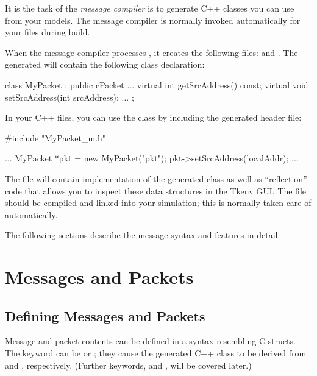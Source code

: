 It is the task of the \textit{message compiler} is to generate C++ classes
you can use from your models. The message compiler is normally invoked
automatically for your  files during build.

When the message compiler processes , it creates the
following files:  and . The
generated  will contain the following class declaration:

\begin{cpp}
class MyPacket : public cPacket {
    ...
    virtual int getSrcAddress() const;
    virtual void setSrcAddress(int srcAddress);
    ...
};
\end{cpp}

In your C++ files, you can use the  class by including the
generated header file:

\begin{cpp}
#include "MyPacket_m.h"

...
MyPacket *pkt = new MyPacket("pkt");
pkt->setSrcAddress(localAddr);
...
\end{cpp}

The  file will contain implementation of the generated 
class as well as ``reflection'' code that allows you to inspect these data
structures in the Tkenv GUI. The  file should be compiled and
linked into your simulation; this is normally taken care of automatically.

The following sections describe the message syntax and features in detail.



\section{Messages and Packets}
\label{sec:ch-msg-defs:messages-and-packets}

\subsection{Defining Messages and Packets}
\label{sec:ch-msg-defs:defining-messages-and-packets}

Message and packet contents can be defined in a syntax resembling C structs.
The keyword can be  or ; they cause
the generated C++ class to be derived from  and
, respectively. (Further keywords,  and
, will be covered later.)

